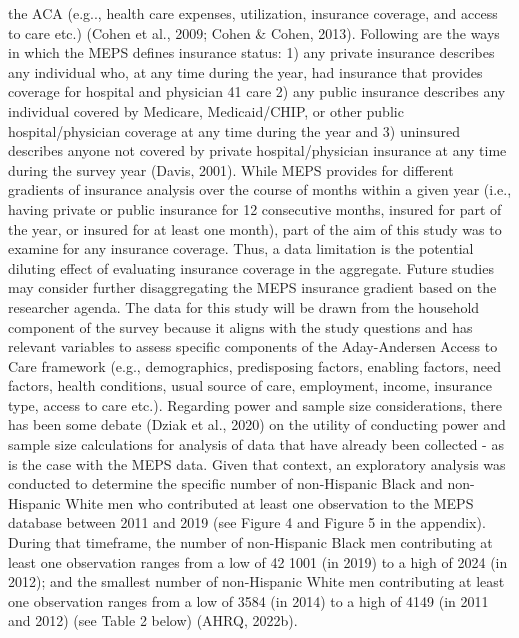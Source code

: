 \documentclass[../main.tex]{subfiles}
\begin{document}
the ACA (e.g.., health care expenses, utilization, insurance coverage, and access to care
etc.) (Cohen et al., 2009; Cohen \& Cohen, 2013). Following are the ways in which the
MEPS defines insurance status: 1) any private insurance describes any individual who, at
any time during the year, had insurance that provides coverage for hospital and physician 
41
care 2) any public insurance describes any individual covered by Medicare,
Medicaid/CHIP, or other public hospital/physician coverage at any time during the year
and 3) uninsured describes anyone not covered by private hospital/physician insurance at
any time during the survey year (Davis, 2001).
While MEPS provides for different gradients of insurance analysis over the
course of months within a given year (i.e., having private or public insurance for 12
consecutive months, insured for part of the year, or insured for at least one month), part
of the aim of this study was to examine for any insurance coverage. Thus, a data
limitation is the potential diluting effect of evaluating insurance coverage in the
aggregate. Future studies may consider further disaggregating the MEPS insurance
gradient based on the researcher agenda.
The data for this study will be drawn from the household component of the survey
because it aligns with the study questions and has relevant variables to assess specific
components of the Aday-Andersen Access to Care framework (e.g., demographics, predisposing factors, enabling factors, need factors, health conditions, usual source of care,
employment, income, insurance type, access to care etc.). Regarding power and sample
size considerations, there has been some debate (Dziak et al., 2020) on the utility of
conducting power and sample size calculations for analysis of data that have already been
collected - as is the case with the MEPS data. Given that context, an exploratory analysis
was conducted to determine the specific number of non-Hispanic Black and non-Hispanic
White men who contributed at least one observation to the MEPS database between 2011
and 2019 (see Figure 4 and Figure 5 in the appendix). During that timeframe, the number
of non-Hispanic Black men contributing at least one observation ranges from a low of 
42
1001 (in 2019) to a high of 2024 (in 2012); and the smallest number of non-Hispanic
White men contributing at least one observation ranges from a low of 3584 (in 2014) to a
high of 4149 (in 2011 and 2012) (see Table 2 below) (AHRQ, 2022b).
\end{document}
